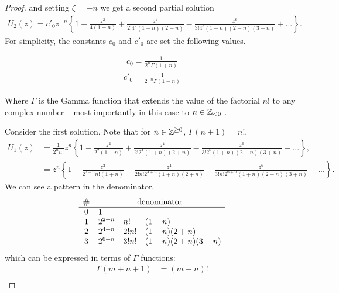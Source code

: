 \begin{proof}
  and setting $\zeta = -n$ we get a second partial solution
    \begin{align*}
      U_2(z) = c'_0z^{-n} \left\{
        1 - \frac{z^2}{4(1-n)} + \frac{z^4}{2!4^2(1-n) (2-n)} - \frac{z^6}{3!4^3(1-n)(2-n)(3-n)} + ...
        \right\}.
    \end{align*}
  For simplicity, the constants $c_0$ and $c'_0$ are set the following values.
  \begin{multicols}{2}
    \noindent
    \begin{align*}
      c_0 = \frac{1}{2^n \Gamma(1+n)}
    \end{align*}
    \begin{align*}
      c'_0 = \frac{1}{2^{-n} \Gamma(1-n)}
    \end{align*}
  \end{multicols}\par
  Where $\Gamma$ is the Gamma function that extends the value of the factorial $n!$ to any complex number -- most importantly in this case to $n \in \mathbb{Z}_{< 0}$ \parencite{kuptsov11gammafunc}.\par
  Consider the first solution. Note that for $n \in \mathbb{Z}^{\geq0}$, $\Gamma (n+1) =n!$.
  \begin{align*}
    U_1(z) &= \frac{1}{2^n n!} z^n \left\{
        1 - \frac{z^2}{2^2(1+n)} + \frac{z^4}{2!2^4(1+n) (2+n)} - \frac{z^6}{3!2^6(1+n)(2+n)(3+n)} + ...
        \right\},\\
      &= z^n \left\{
        1 - \frac{z^2}{2^{2+n} n!(1+n)} + \frac{z^4}{2!n! 2^{4+n} (1+n) (2+n)} - \frac{z^6}{3!n! 2^{6+n} (1+n) (2+n) (3+n)} + ...
        \right\}.
  \end{align*}
  We can see a pattern in the denominator,
  \begin{align*}
    \begin{array}{c|lll}
      \# &  \multicolumn{3}{c}{\text{denominator}}\\
      \hline
      0   &   1                                        \\
      1   &   2^{2+n} &   n!    &   (1+n)              \\
      2   &   2^{4+n} &   2!n!  &   (1+n) (2+n)        \\
      3   &   2^{6+n} &   3!n!  &   (1+n) (2+n) (3+n)
    \end{array}
  \end{align*}
  which can be expressed in terms of $\Gamma$ functions:
  \begin{align*}
    \Gamma(m+n+1) &= (m+n)! \\

\end{align*}
\end{proof}

